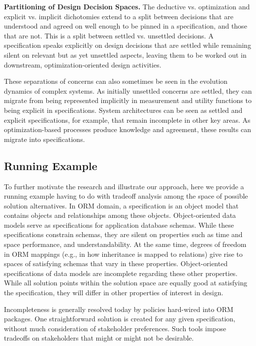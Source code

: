 \documentclass[10pt,conference]{IEEEtran}
\begin{document}
\textbf{Partitioning of Design Decision Spaces.}
The deductive vs. optimization and explicit vs. implicit dichotomies extend to a split between decisions that are understood and agreed on well enough to be pinned in a specification, and those that are not. This is a split between settled vs. unsettled decisions. A specification speaks explicitly on design decisions that are settled while remaining silent on relevant but as yet unsettled aspects, leaving them to be worked out in downstream, optimization-oriented design activities.

These separations of concerns can also sometimes be seen in the evolution dynamics of complex systems. As initially unsettled concerns are settled, they can migrate from being represented implicitly in measurement and utility functions to being explicit in specifications. System architectures can be seen as settled and explicit specifications, for example, that remain incomplete in other key areas. As optimization-based processes produce knowledge and agreement, these results can migrate into specifications.

\subsection{Running Example}
To further motivate the research and illustrate our approach, here we provide a running example having to do with tradeoff analysis among the space of possible solution alternatives. In ORM domain, a specification is an object model that contains objects and relationships among these objects. Object-oriented data models serve as specifications for application database schemas. While these specifications constrain schemas, they are silent on properties such as time and space performance, and understandability. At the same time, degrees of freedom in ORM mappings (e.g., in how inheritance is mapped to relations) give rise to spaces of satisfying schemas that vary in these properties. Object-oriented specifications of data models are incomplete regarding these other properties. While all solution points within the solution space are equally good at satisfying the specification, they will differ in other properties of interest in design.  

Incompleteness is generally resolved today by policies hard-wired into ORM packages. One straightforward solution is created for any given specification, without much consideration of stakeholder preferences. Such tools impose tradeoffs on stakeholders that might or might not be desirable.
\end{document}

